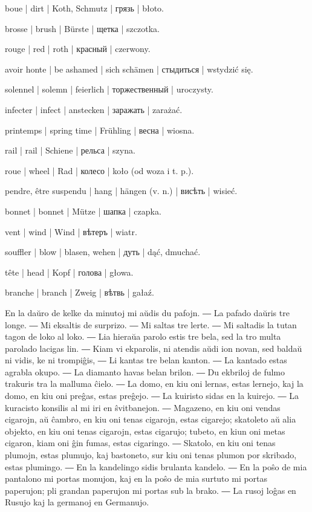 \begin{ekzvocab}{1em}
 boue | dirt | Koth, Schmutz | грязь | błoto.

 brosse | brush | Bürste | щетка | szczotka.

 rouge | red | roth | красный | czerwony.

 avoir honte | be ashamed | sich schämen | стыдиться | wstydzić się.

 solennel | solemn | feierlich | торжественный | uroczysty.

 infecter | infect | anstecken | заражать | zarażać.

 printemps | spring time | Frühling | весна | wiosna.

 rail | rail | Schiene | рельса | szyna.

 roue | wheel | Rad | колесо | koło (od woza i t. p.).

 pendre, être suspendu | hang | hängen (v. n.) | висѣть | wisieć.

 bonnet | bonnet | Mütze | шапка | czapka.

 vent | wind | Wind | вѣтеръ | wiatr.

 souffler | blow | blasen, wehen | дуть | dąć, dmuchać.

 tête | head | Kopf | голова | głowa.

 branche | branch | Zweig | вѣтвь | gałaź.

\end{ekzvocab}



En la daŭro de kelke da minutoj mi aŭdis du pafojn. ― La pafado daŭris tre longe. ― Mi eksaltis de surprizo. ― Mi saltas tre lerte. ― Mi saltadis la tutan tagon de loko al loko. ― Lia hieraŭa parolo estis tre bela, sed la tro multa parolado lacigas lin. ― Kiam vi ekparolis, ni atendis aŭdi ion novan, sed baldaŭ ni vidis, ke ni trompiĝis, ― Li kantas tre belan kanton. ― La kantado estas agrabla okupo. ― La diamanto havas belan brilon. ― Du ekbriloj de fulmo trakuris tra la malluma ĉielo. ― La domo, en kiu oni lernas, estas lernejo, kaj la domo, en kiu oni preĝas, estas preĝejo. ― La kuiristo sidas en la kuirejo. ― La kuracisto konsilis al mi iri en ŝvitbanejon. ― Magazeno, en kiu oni vendas cigarojn, aŭ ĉambro, en kiu oni tenas cigarojn, estas cigarejo; skatoleto aŭ alia objekto, en kiu oni tenas cigarojn, estas cigarujo; tubeto, en kiun oni metas cigaron, kiam oni ĝin fumas, estas cigaringo. ― Skatolo, en kiu oni tenas plumojn, estas plumujo, kaj bastoneto, sur kiu oni tenas plumon por skribado, estas plumingo. ― En la kandelingo sidis brulanta kandelo. ― En la poŝo de mia pantalono mi portas monujon, kaj en la poŝo de mia surtuto mi portas paperujon; pli grandan paperujon mi portas sub la brako. ― La rusoj loĝas en Rusujo kaj la germanoj en Germanujo.


